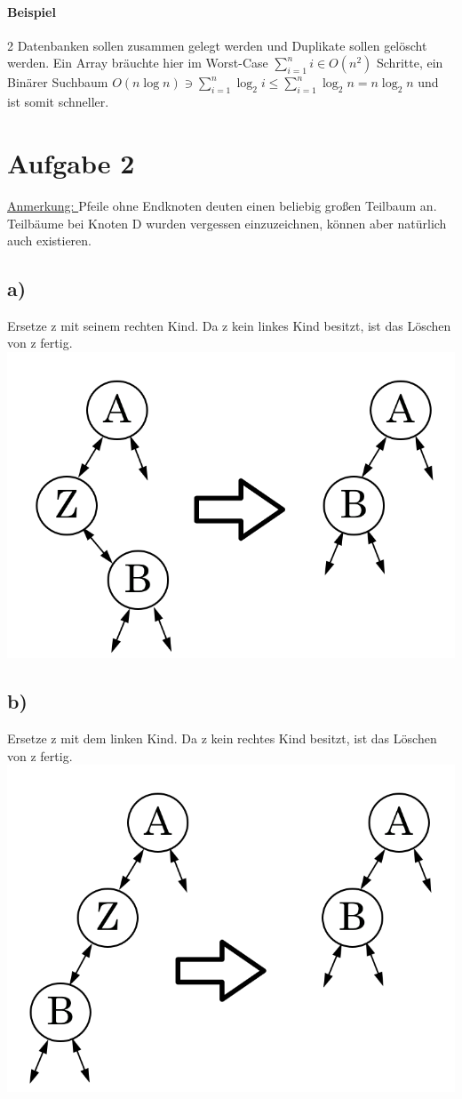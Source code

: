 \documentclass[a4paper,11pt,twoside]{article}
\begin{document}
\paragraph*{Beispiel} 2 Datenbanken sollen zusammen gelegt werden und Duplikate sollen gelöscht werden. Ein Array bräuchte hier im Worst-Case $\sum_{i=1}^n i \in O(n^2)$ Schritte, ein Binärer Suchbaum $O(n \log n)\ni\sum_{i=1}^n\log_2 i \leq \sum_{i=1}^n\log_2 n = n \log_2 n$ und ist somit schneller.
\pagebreak
\section*{Aufgabe 2}
\underline{Anmerkung: } Pfeile ohne Endknoten deuten einen beliebig großen Teilbaum an. Teilbäume bei Knoten D wurden vergessen einzuzeichnen, können aber natürlich auch existieren.
\subsection*{a)} Ersetze z mit seinem rechten Kind. Da z kein linkes Kind besitzt, ist das Löschen von z fertig.\\
\includegraphics*[scale=0.2]{Images/A.png}
\subsection*{b)}Ersetze z mit dem linken Kind. Da z kein rechtes Kind besitzt, ist das Löschen von z fertig.\\
\includegraphics*[scale=0.2]{Images/B.png}
\end{document}
